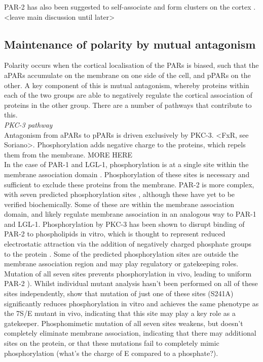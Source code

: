 \documentclass[12pt]{"report"}
\begin{document}
PAR-2 has also been suggested to self-associate and form clusters on the cortex \citep{Arata2016}. <leave main discussion until later>\\


\subsection{Maintenance of polarity by mutual antagonism}

Polarity occurs when the cortical localisation of the PARs is biased, such that the aPARs accumulate on the membrane on one side of the cell, and pPARs on the other. A key component of this is mutual antagonism, whereby proteins within each of the two groups are able to negatively regulate the cortical association of proteins in the other group. There are a number of pathways that contribute to this.\\

\textit{PKC-3 pathway}\\ 

Antagonism from aPARs to pPARs is driven exclusively by PKC-3. <FxR, see Soriano>. Phosphorylation adds negative charge to the proteins, which repels them from the membrane. MORE HERE\\

In the case of PAR-1 and LGL-1, phosphorylation is at a single site within the membrane association domain \citep{Hoege2010, Motegi2011}. Phosphorylation of these sites is necessary and sufficient to exclude these proteins from the membrane. PAR-2 is more complex, with seven predicted phosphorylation sites \citep{Hao2006}, although these have yet to be verified biochemically. Some of these are within the membrane association domain, and likely regulate membrane association in an analogous way to PAR-1 and LGL-1. Phosphorylation by PKC-3 has been shown to disrupt binding of PAR-2 to phospholipids in vitro, which is thought to represent reduced electrostatic attraction via the addition of negatively charged phosphate groups to the protein \citep{Motegi2011}. Some of the predicted phosphorylation sites are outside the membrane association region and may play regulatory or gatekeeping roles. Mutation of all seven sites prevents phosphorylation in vivo, leading to uniform PAR-2 \citep{Hao2006}). Whilst individual mutant analysis hasn't been performed on all of these sites independently, \textcite{Motegi2011} show that mutation of just one of these sites (S241A) significantly reduces phosphorylation in vitro and achieves the same phenotype as the 7S/E mutant in vivo, indicating that this site may play a key role as a gatekeeper. Phosphomimetic mutation of all seven sites weakens, but doesn't completely eliminate membrane association, indicating that there may additional sites on the protein, or that these mutations fail to completely mimic phosphorylation (what’s the charge of E compared to a phosphate?). \\
\end{document}

